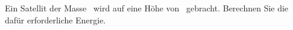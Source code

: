 Ein Satellit der Masse \mSaO\ wird auf eine Höhe von \hSaO\ gebracht. Berechnen Sie die dafür erforderliche Energie.
